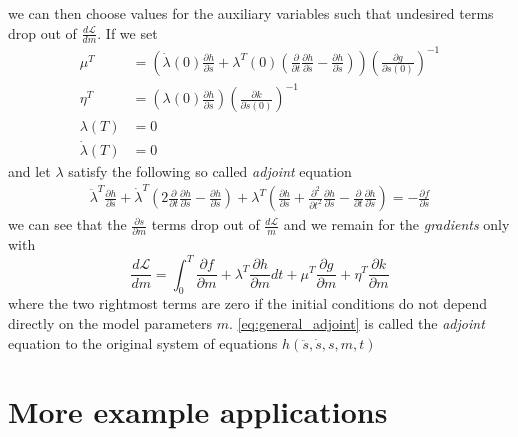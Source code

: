 \documentclass[fleqn,11pt]{SelfArx} %
\newcommand{\pder}[2][]{\frac{\partial#1}{\partial#2}}
\newcommand{\ppder}[2][]{\frac{\partial^2#1}{\partial#2^2}}
\theoremstyle{definition}
\begin{document}
we can then choose values for the auxiliary variables such that undesired terms drop out of $\frac{d\mathcal{L}}{dm}$. If we set 
\begin{equation}
\begin{aligned}
\mu^T &= \left(\dot \lambda(0) \pder[h]{\ddot s} + \lambda^T(0)\left(\pder{t} \pder[h]{\ddot s} - \pder[h]{\dot s} \right)\right) \left(\pder[g]{s(0)}\right)^{-1} \\
\eta^T &= \left(\lambda(0) \pder[h]{\ddot s} \right)\left(\pder[k]{\dot s(0)}\right)^{-1}\\
\lambda(T) & = 0\\
\dot \lambda(T) &= 0
\end{aligned}
\end{equation}
and let $\lambda$ satisfy the following so called \emph{adjoint} equation 
\begin{equation}
\label{eq:general_adjoint}
\begin{aligned}
\ddot \lambda^T \pder[h]{\ddot s} + \dot \lambda^T \left(2\pder{t}\pder[h]{\ddot s} - \pder[h]{\dot s} \right)
 + \lambda^T\left(\pder[h]{s} + \ppder{t}\pder[h]{\ddot s} -\pder{t}\pder[h]{\dot s}\right) = -\pder[f]{s}
\end{aligned}
\end{equation}
we can see that the $\pder[s]{m}$ terms drop out of $\frac{d\mathcal{L}}{m}$ and we remain for the \emph{gradients} only with
\begin{equation}\label{eq:general_gradient}
\frac{d\mathcal{L}}{dm} =\int_0^T \pder[f]{m} + \lambda^T \pder[h]{m} dt + \mu^T \pder[g]{m} + \eta^T \pder[k]{m}
\end{equation} 
where the two rightmost terms are zero if the initial conditions do not depend directly on the model parameters $m$. \cref{eq:general_adjoint} is called the \emph{adjoint} equation to the original system of equations $h\left(\ddot s, \dot s, s, m, t\right)$

\section{More example applications}\label{sec:examples}
\end{document}
